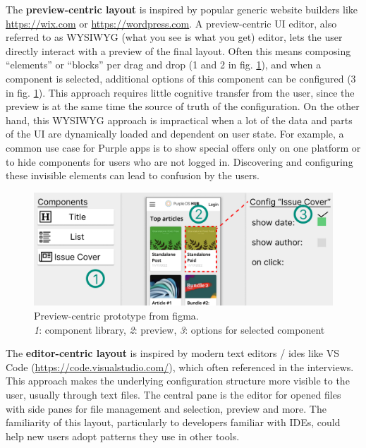 The \textbf{preview-centric layout} is inspired by popular generic website builders like \url{https://wix.com} or \url{https://wordpress.com}.
A preview-centric UI editor, also referred to as WYSIWYG (what you see is what you get) editor, lets the user directly interact with a preview of the final layout.
Often this means composing ``elements'' or ``blocks'' per drag and drop (1 and 2 in fig. \ref{fig:preview-centric}), and when a component is selected, additional options of this component can be configured (3 in fig. \ref{fig:preview-centric}).
This approach requires little cognitive transfer from the user, since the preview is at the same time the source of truth of the configuration.
On the other hand, this WYSIWYG approach is impractical when a lot of the data and parts of the UI are dynamically loaded and dependent on user state.
For example, a common use case for Purple apps is to show special offers only on one platform or to hide components for users who are not logged in.
Discovering and configuring these invisible elements can lead to confusion by the users. 
\begin{figure}[h!]
  \includegraphics[width=\textwidth]{pics/preview_centric.png}
  \caption[Preview-centric prototype]{Preview-centric prototype from figma.\\\textit{1}: component library, \textit{2}: preview, \textit{3}: options for selected component}
  \label{fig:preview-centric}
\end{figure}
\newpage
The \textbf{editor-centric layout} is inspired by modern text editors / \Gls{ide}s like VS Code (\url{https://code.visualstudio.com/}), which often referenced in the interviews.
This approach makes the underlying configuration structure more visible to the user, usually through text files.
The central pane is the editor for opened files with side panes for file management and selection, preview and more.
The familiarity of this layout, particularly to developers familiar with IDEs, could help new users adopt patterns they use in other tools.
